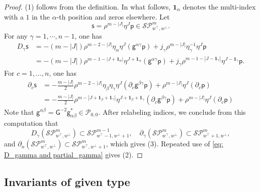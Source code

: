 \documentclass[11pt]{amsart}
\theoremstyle{definition}
\numberwithin{equation}{section}
\begin{document}
\begin{proof} 
(1) follows from the definition.  In what follows, $\mathbf 1_\alpha$ denotes the multi-index with a $1$ in the $\alpha$-th position and zeros elsewhere. Let 
	\[\mathsf s = \rho^{m-|J|}\eta^J\mathsf p\in\mathcal{SP}_{w^\top,w^\bot}^m.\] For any $\gamma=1,\cdots,n-1$, one has
	\begin{align*}
		D_{\gamma}\mathsf s
		& =  -(m -|J|)\rho^{ m - 2 - |J|} \eta_\alpha\eta^J(\mathsf g^{\alpha\gamma}  \mathsf p) +  j_\gamma \rho ^{m - |J|}\eta_\gamma^{-1}\eta^J \mathsf p\\
		& =  -(m -|J|)\rho ^{ m - 1 - |J+\mathbf 1_\alpha|}\eta^{J+\mathbf 1_\alpha}(  \mathsf g^{\alpha\gamma}\mathsf p) + j_\gamma \rho ^{m -1 - |J-\mathbf 1_\gamma|}\eta^{J-\mathbf 1_\gamma}\mathsf p.
	\end{align*}
	For $c=1,\dots,n$, one has
	\begin{align*}
		\partial_{c} \mathsf s 
		& = -\frac{m -|J|}{2}\rho ^{ m - 2 - |J|} \eta_\beta \eta_\gamma\eta^J (\partial_c  \mathsf g^{\beta\gamma}\mathsf p) + \rho^{m -|J|}\eta^J (\partial_c\mathsf p)\\
		& = -\frac{m -|J|}{2}\rho^{m - |J + \mathbf 1_\beta + \mathbf 1_\gamma|}\eta^{J + \mathbf 1_\beta + \mathbf 1_\gamma}(\partial_c\mathsf g^{\beta\gamma}\mathsf p) + \rho^{m -|J|}\eta^J (\partial_c\mathsf p)
	\end{align*}
	Note that $\mathsf g^{\alpha\beta} = \mathsf G^{-2}  \mathsf g_{\alpha\beta}^*\in\mathcal P_{0,0}$. After relabeling indices, we conclude from this computation that 
	\begin{equation}
		\label{eq: D_gamma and partial_gamma}
		D_\gamma(\mathcal{SP}_{w^\top,w^\bot}^m) \subset \mathcal{SP}_{w^\top-1,w^\bot+1}^{m-1},\quad \partial_\gamma(\mathcal{SP}_{w^\top,w^\bot}^m) \subset \mathcal{SP}_{w^\top+1,w^\bot}^m,
	\end{equation}
	and $\partial_n(\mathcal{SP}_{w^\top,w^\bot}^m) \subset \mathcal{SP}_{w^\top,w^\bot+1}^m$, which gives (3).
	Repeated use of \eqref{eq: D_gamma and partial_gamma} gives (2). 
\end{proof} 
 



 
 
 \subsection{Invariants of given type}  
 
\end{document}
